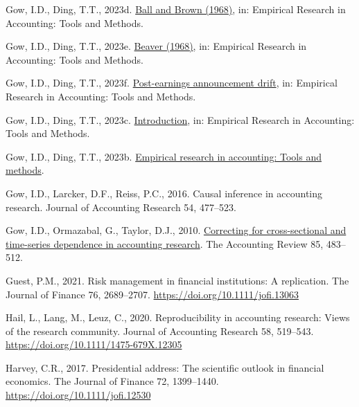 \documentclass[
  letterpaper,
  DIV=11,
  numbers=noendperiod]{scrartcl}
\newlength{\cslhangindent}
\newlength{\cslentryspacingunit} %
\newenvironment{CSLReferences}[2] %
 {%
  \setlength{\parindent}{0pt}
  \ifodd #1
  \let\oldpar\par
  \def\par{\hangindent=\cslhangindent\oldpar}
  \fi
  \setlength{\parskip}{#2\cslentryspacingunit}
 }%
 {}
\begin{document}
\begin{CSLReferences}{1}{0}
\leavevmode{}%
Gow, I.D., Ding, T.T., 2023d.
\href{https://iangow.github.io/far_book/bb68.html}{{B}all and {B}rown
(1968)}, in: Empirical Research in Accounting: Tools and Methods.

\leavevmode{}%
Gow, I.D., Ding, T.T., 2023e.
\href{https://iangow.github.io/far_book/beaver68.html}{Beaver (1968)},
in: Empirical Research in Accounting: Tools and Methods.

\leavevmode{}%
Gow, I.D., Ding, T.T., 2023f.
\href{https://iangow.github.io/far_book/pead.html}{Post-earnings
announcement drift}, in: Empirical Research in Accounting: Tools and
Methods.

\leavevmode{}%
Gow, I.D., Ding, T.T., 2023c.
\href{https://iangow.github.io/far_book/intro.html}{Introduction}, in:
Empirical Research in Accounting: Tools and Methods.

\leavevmode{}%
Gow, I.D., Ding, T.T., 2023b.
\href{https://iangow.github.io/far_book}{Empirical research in
accounting: Tools and methods}.

\leavevmode{}%
Gow, I.D., Larcker, D.F., Reiss, P.C., 2016. Causal inference in
accounting research. Journal of Accounting Research 54, 477--523.

\leavevmode{}%
Gow, I.D., Ormazabal, G., Taylor, D.J., 2010.
\href{http://www.jstor.org/stable/20744139}{Correcting for
cross-sectional and time-series dependence in accounting research}. The
Accounting Review 85, 483--512.

\leavevmode{}%
Guest, P.M., 2021. Risk management in financial institutions: A
replication. The Journal of Finance 76, 2689--2707.
\url{https://doi.org/10.1111/jofi.13063}

\leavevmode{}%
Hail, L., Lang, M., Leuz, C., 2020. Reproducibility in accounting
research: Views of the research community. Journal of Accounting
Research 58, 519--543. \url{https://doi.org/10.1111/1475-679X.12305}

\leavevmode{}%
Harvey, C.R., 2017. Presidential address: The scientific outlook in
financial economics. The Journal of Finance 72, 1399--1440.
\url{https://doi.org/10.1111/jofi.12530}


\end{CSLReferences}
\end{document}
